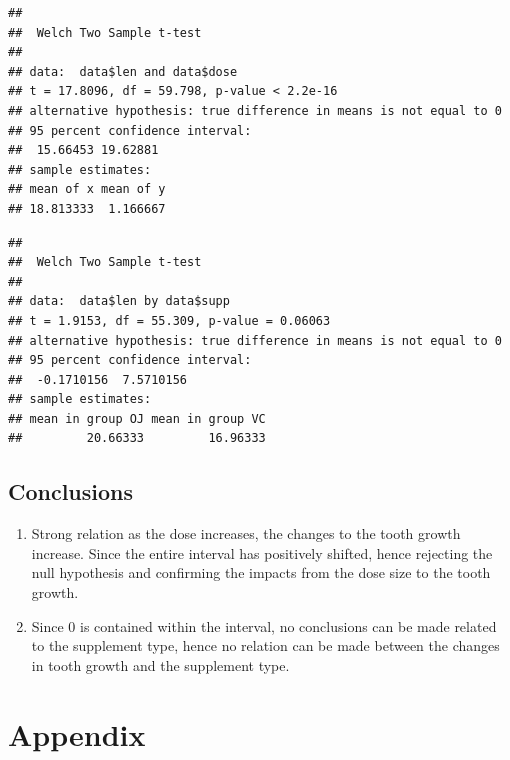 \documentclass[]{article}
\newenvironment{Shaded}{\begin{snugshade}}{\end{snugshade}}
\newcommand{\KeywordTok}[1]{\textcolor[rgb]{0.13,0.29,0.53}{\textbf{{#1}}}}
\newcommand{\StringTok}[1]{\textcolor[rgb]{0.31,0.60,0.02}{{#1}}}
\newcommand{\CommentTok}[1]{\textcolor[rgb]{0.56,0.35,0.01}{\textit{{#1}}}}
\newcommand{\NormalTok}[1]{{#1}}
\begin{document}
\begin{verbatim}
## 
##  Welch Two Sample t-test
## 
## data:  data$len and data$dose
## t = 17.8096, df = 59.798, p-value < 2.2e-16
## alternative hypothesis: true difference in means is not equal to 0
## 95 percent confidence interval:
##  15.66453 19.62881
## sample estimates:
## mean of x mean of y 
## 18.813333  1.166667
\end{verbatim}

\begin{Shaded}
\end{Shaded}

\begin{verbatim}
## 
##  Welch Two Sample t-test
## 
## data:  data$len by data$supp
## t = 1.9153, df = 55.309, p-value = 0.06063
## alternative hypothesis: true difference in means is not equal to 0
## 95 percent confidence interval:
##  -0.1710156  7.5710156
## sample estimates:
## mean in group OJ mean in group VC 
##         20.66333         16.96333
\end{verbatim}

\subsection{Conclusions}\label{conclusions}

\begin{enumerate}
\def\labelenumi{\arabic{enumi}.}
\itemsep1pt\parskip0pt
\item
  Strong relation as the dose increases, the changes to the tooth growth
  increase. Since the entire interval has positively shifted, hence
  rejecting the null hypothesis and confirming the impacts from the dose
  size to the tooth growth.
\item
  Since 0 is contained within the interval, no conclusions can be made
  related to the supplement type, hence no relation can be made between
  the changes in tooth growth and the supplement type.
\end{enumerate}

\pagebreak

\section{Appendix}\label{appendix}
\end{document}

